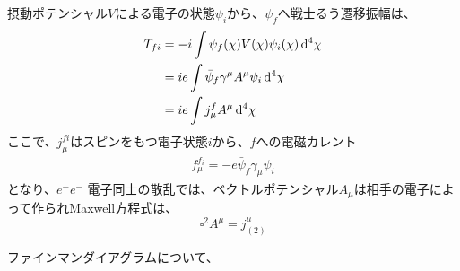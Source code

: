 \documentclass[titlepage]{ltjsarticle}
\begin{document}
摂動ポテンシャル\(V\)による電子の状態\(\psi_i\)から、\(\psi_f\)へ戦士るう遷移振幅は、
\begin{align}
  T_{fi} & = -i \int \psi_f(\chi)V(\chi) \psi_i(\chi) \odif[order=4]{\chi}\\
  & = ie \int \bar{\psi}_f \gamma^\mu A^{\mu} \psi_i \odif[order=4]{\chi}\\
  & = ie \int j_\mu^f A^\mu \odif[order=4]{\chi}
\end{align}
ここで、\(j^{fi}_{\mu}\)はスピンをもつ電子状態\(i\)から、\(f\)への電磁カレント
\begin{align}
  f^{f_i}_\mu = -e \bar{\psi}_f \gamma_\mu \psi_i
\end{align}
となり、\(e^- e^-\)
電子同士の散乱では、ベクトルポテンシャル\(A_\mu\)は相手の電子によって作られMaxwell方程式は、
\begin{equation}
  \square^2 A^\mu = j^{\mu}_{(2)}
\end{equation}

ファインマンダイアグラムについて、
\end{document}
